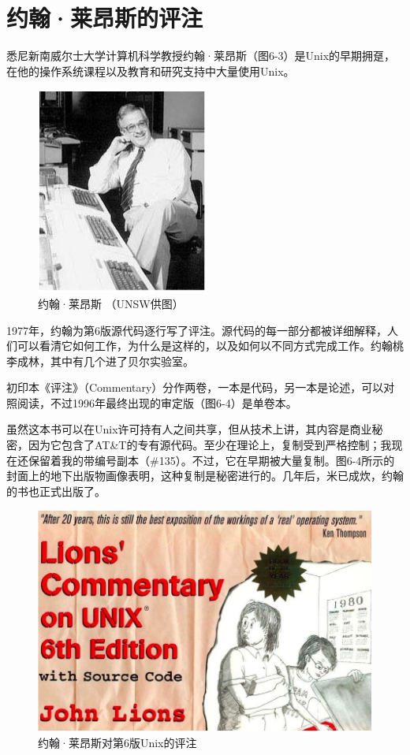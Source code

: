 \documentclass[a4paper,12pt,UTF8,twoside]{ctexbook}
\begin{document}
\section{约翰·莱昂斯的评注}

悉尼新南威尔士大学计算机科学教授约翰·莱昂斯（图6-3）是Unix的早期拥趸，在他的操作系统课程以及教育和研究支持中大量使用Unix。

\begin{figure}[htbp]
	\centering
	\includegraphics[width=0.7\linewidth]{61}
	\caption{约翰·莱昂斯 （UNSW供图）}
	\label{fig:1}
\end{figure}

1977年，约翰为第6版源代码逐行写了评注。源代码的每一部分都被详细解释，人们可以看清它如何工作，为什么是这样的，以及如何以不同方式完成工作。约翰桃李成林，其中有几个进了贝尔实验室。

初印本《评注》（Commentary）分作两卷，一本是代码，另一本是论述，可以对照阅读，不过1996年最终出现的审定版（图6-4）是单卷本。

虽然这本书可以在Unix许可持有人之间共享，但从技术上讲，其内容是商业秘密，因为它包含了AT\&T的专有源代码。至少在理论上，复制受到严格控制；我现在还保留着我的带编号副本（\#135）。不过，它在早期被大量复制。图6-4所示的封面上的地下出版物画像表明，这种复制是秘密进行的。几年后，米已成炊，约翰的书也正式出版了。

\begin{figure}[htbp]
	\centering
	\includegraphics[width=0.7\linewidth]{62}
	\caption{约翰·莱昂斯对第6版Unix的评注}
	\label{fig:1}
\end{figure}
\end{document}
